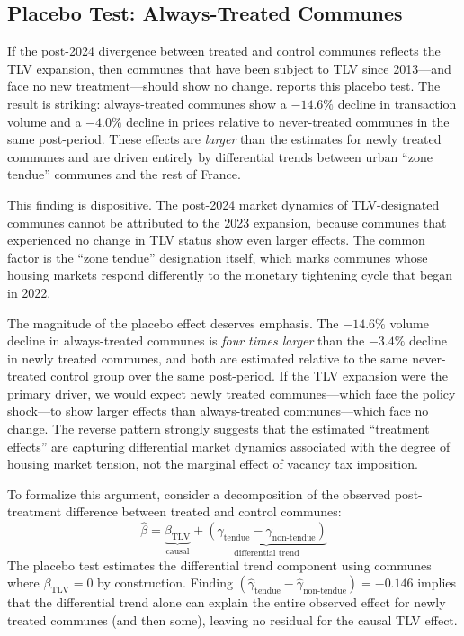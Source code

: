 \documentclass[12pt]{article}
\begin{document}
\subsection{Placebo Test: Always-Treated Communes}

If the post-2024 divergence between treated and control communes reflects the TLV expansion, then communes that have been subject to TLV since 2013---and face no new treatment---should show no change.  reports this placebo test. The result is striking: always-treated communes show a $-14.6\%$ decline in transaction volume and a $-4.0\%$ decline in prices relative to never-treated communes in the same post-period. These effects are \textit{larger} than the estimates for newly treated communes and are driven entirely by differential trends between urban ``zone tendue'' communes and the rest of France.

This finding is dispositive. The post-2024 market dynamics of TLV-designated communes cannot be attributed to the 2023 expansion, because communes that experienced no change in TLV status show even larger effects. The common factor is the ``zone tendue'' designation itself, which marks communes whose housing markets respond differently to the monetary tightening cycle that began in 2022.

The magnitude of the placebo effect deserves emphasis. The $-14.6\%$ volume decline in always-treated communes is \textit{four times larger} than the $-3.4\%$ decline in newly treated communes, and both are estimated relative to the same never-treated control group over the same post-period. If the TLV expansion were the primary driver, we would expect newly treated communes---which face the policy shock---to show larger effects than always-treated communes---which face no change. The reverse pattern strongly suggests that the estimated ``treatment effects'' are capturing differential market dynamics associated with the degree of housing market tension, not the marginal effect of vacancy tax imposition.

To formalize this argument, consider a decomposition of the observed post-treatment difference between treated and control communes:
\begin{equation}
\hat{\beta} = \underbrace{\beta_{\text{TLV}}}_{\text{causal}} + \underbrace{(\gamma_{\text{tendue}} - \gamma_{\text{non-tendue}})}_{\text{differential trend}}
\end{equation}
\noindent The placebo test estimates the differential trend component using communes where $\beta_{\text{TLV}} = 0$ by construction. Finding $(\hat{\gamma}_{\text{tendue}} - \hat{\gamma}_{\text{non-tendue}}) = -0.146$ implies that the differential trend alone can explain the entire observed effect for newly treated communes (and then some), leaving no residual for the causal TLV effect.
\end{document}
